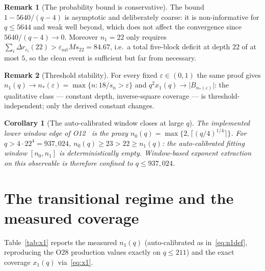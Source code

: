 \documentclass[11pt,a4paper]{article}
\theoremstyle{plain}
\newtheorem{corollary}{Corollary}
\theoremstyle{definition}
\newtheorem{remark}{Remark}
\newcommand{\epssat}{\varepsilon_{\mathrm{sat}}}
\newcommand{\xone}{x_1}
\newcommand{\none}{n_1}
\begin{document}
    \begin{remark}[The probability bound is conservative]
      \label{rem:conservative}
      The bound $1 - 5640/(q-4)$ is asymptotic and deliberately coarse: it is non-informative for
      $q \le 5644$ and weak well beyond, which does not affect the convergence since
      $5640/(q-4) \to 0$.
      Moreover $\none = 22$ only requires $\sum_i \Delta r_{c_i}(22) > \epssat M s_{22} = 84.67$,
      i.e.\ a total five-block deficit at depth $22$ of at most $5$, so the clean event is
      sufficient but far from necessary.
    \end{remark}

    \begin{remark}[Threshold stability]
      \label{rem:threshold}
      For every fixed $\varepsilon \in (0,1)$ the same proof gives
      $\none(q) \to n_*(\varepsilon) = \max\{n : 18/s_n > \varepsilon\}$ and
      $q^2 \xone(q) \to \lvert B_{n_*(\varepsilon)}\rvert$: the qualitative class --- constant
      depth, inverse-square coverage --- is threshold-independent; only the derived constant
      changes.
    \end{remark}

    \begin{corollary}[The auto-calibrated window closes at large $q$]
      \label{cor:window}
      The implemented lower window edge of O12~\cite{Beau2026a16} is the proxy
      $n_0(q)=\max\{2,\lceil(q/4)^{1/4}\rceil\}$.
      For $q > 4\cdot22^4 = 937{,}024$, $n_0(q) \ge 23 > 22 \ge \none(q)$: the auto-calibrated
      fitting window $[n_0, \none]$ is deterministically empty.
      Window-based exponent extraction on this observable is therefore confined to
      $q \le 937{,}024$.
    \end{corollary}

  \section{The transitional regime and the measured coverage}
    \label{sec:data}

    Table~\ref{tab:x1} reports the measured $\none(q)$ (auto-calibrated as in~\eqref{eq:n1def},
    reproducing the O28 production values exactly on $q \le 211$) and the exact coverage
    $\xone(q)$ via~\eqref{eq:x1}.
\end{document}
